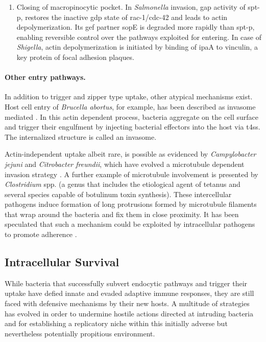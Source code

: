 \begin{enumerate}[label=(\alph*)]
  \item Closing of macropinocytic pocket. In \textit{Salmonella} invasion, \gls{gap} activity of \gls{spt-p}, restores the inactive \gls{gdp} state of \gls{rac-1}/\gls{cdc-42} and leads to actin depolymerization. Its \gls{gef} partner \acrshort{sop}E is degraded more rapidly than \gls{spt-p}, enabling reversible control over the pathways exploited for entering. In case of \textit{Shigella}, actin depolymerization is initiated by binding of \acrshort{ipa}A to vinculin, a key protein of focal adhesion plaques.
\end{enumerate}

\paragraph{Other entry pathways.}
In addition to trigger and zipper type uptake, other atypical mechanisms exist. Host cell entry of \textit{Brucella abortus}, for example, has been described as invasome mediated \citep{Dehio2005}. In this actin dependent process, bacteria aggregate on the cell surface and trigger their engulfment by injecting bacterial effectors into the host via \gls{t4ss}. The internalized structure is called an invasome.

Actin-independent uptake albeit rare, is possible as evidenced by \textit{Campylobacter jejuni} and \textit{Citrobacter freundii}, which have evolved a microtubule dependent invasion strategy \citep{Kopecko2001}. A further example of microtubule involvement is presented by \textit{Clostridium} spp. (a genus that includes the etiological agent of tetanus and several species capable of botulinum toxin synthesis). These intercellular pathogens induce formation of long protrusions formed by microtubule filaments that wrap around the bacteria and fix them in close proximity. It has been speculated that such a mechanism could be exploited by intracellular pathogens to promote adherence \citep{Haglund2011}.

\subsection{Intracellular Survival}
While bacteria that successfully subvert endocytic pathways and trigger their uptake have defied innate and evaded adaptive immune responses, they are still faced with defensive mechanisms by their new hosts. A multitude of strategies has evolved in order to undermine hostile actions directed at intruding bacteria and for establishing a replicatory niche within this initially adverse but nevertheless potentially propitious environment.

